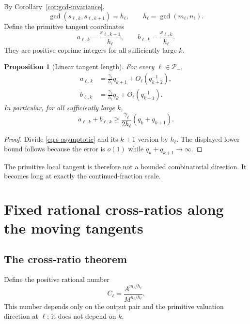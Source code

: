 \documentclass[11pt,oneside]{article}
\newtheorem{proposition}[theorem]{Proposition}
\theoremstyle{definition}
\theoremstyle{remark}
\begin{document}
By Corollary~\ref{cor:gcd-invariance},
\begin{equation}
 \gcd(s_{\ell,k},s_{\ell,k+1})=h_\ell,
 \qquad h_\ell=\gcd(m_\ell,n_\ell).
 \label{eq:s-gcd}
\end{equation}
Define the primitive tangent coordinates
\begin{equation}
 a_{\ell,k}=\frac{s_{\ell,k+1}}{h_\ell},
 \qquad
 b_{\ell,k}=\frac{s_{\ell,k}}{h_\ell}.
 \label{eq:ab}
\end{equation}
They are positive coprime integers for all sufficiently large $k$.

\begin{proposition}[Linear tangent length]
\label{prop:tangent-length}
For every $\ell\in\mathcal P_-$,
\begin{align}
 a_{\ell,k}
 &=\frac{\gamma_\ell}{h_\ell}q_{k+1}
   +O_\ell(q_{k+2}^{-1}),
 \label{eq:a-asymp}\\
 b_{\ell,k}
 &=\frac{\gamma_\ell}{h_\ell}q_k
   +O_\ell(q_{k+1}^{-1}).
 \label{eq:b-asymp}
\end{align}
In particular, for all sufficiently large $k$,
\begin{equation}
 a_{\ell,k}+b_{\ell,k}
 \ge \frac{\gamma_\ell}{2h_\ell}(q_k+q_{k+1}).
 \label{eq:length-lower}
\end{equation}
\end{proposition}

\begin{proof}
Divide \eqref{eq:s-asymptotic} and its $k+1$ version by $h_\ell$.  The displayed lower
bound follows because the error is $o(1)$ while $q_k+q_{k+1}\to\infty$.
\end{proof}

The primitive local tangent is therefore not a bounded combinatorial direction.  It becomes
long at exactly the continued-fraction scale.

\section{Fixed rational cross-ratios along the moving tangents}
\label{sec:crossratio}

\subsection{The cross-ratio theorem}

Define the positive rational number
\begin{equation}
 C_\ell=\frac{A^{m_\ell/h_\ell}}{M^{n_\ell/h_\ell}}.
 \label{eq:Cell}
\end{equation}
This number depends only on the output pair and the primitive valuation direction at $\ell$;
it does not depend on $k$.
\end{document}
